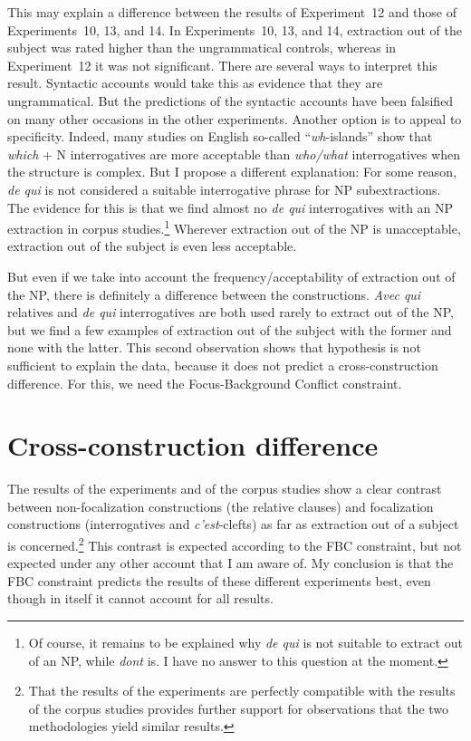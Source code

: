 This may explain a difference between the results of Experiment~12 and those of Experiments~10, 13, and 14. In Experiments~10, 13, and 14, extraction out of the subject was rated higher than the ungrammatical controls, whereas in Experiment~12 it was not significant. There are several ways to interpret this result. Syntactic accounts would take this as evidence that they are ungrammatical. But the predictions of the syntactic accounts have been falsified on many other occasions in the other experiments. Another option is to appeal to specificity. Indeed, many studies on English so-called ``\emph{wh}-islands'' show that \emph{which} + N interrogatives are more acceptable than \emph{who/what} interrogatives when the structure is complex. But I propose a different explanation: For some reason, \emph{de qui} is not considered a suitable interrogative phrase for NP subextractions. The evidence for this is that we find almost no \emph{de qui} interrogatives with an NP extraction in corpus studies.\footnote{Of course, it remains to be explained why \emph{de qui} is not suitable to extract out of an NP, while \emph{dont} is. I have no answer to this question at the moment.} Wherever extraction out of the NP is unacceptable, extraction out of the subject is even less acceptable.

But even if we take into account the frequency/acceptability of extraction out of the NP, there is definitely a difference between the constructions. \emph{Avec qui} relatives and \emph{de qui} interrogatives are both used rarely to extract out of the NP, but we find a few examples of extraction out of the subject with the former and none with the latter. This second observation shows that  hypothesis is not sufficient to explain the data, because it does not predict a cross-construction difference. For this, we need the Focus-Background Conflict constraint.

\section{Cross-construction difference}
\label{ch:exp-conclu-cross-construction}

The results of the experiments and of the corpus studies show a clear contrast between non-focalization constructions (the relative clauses) and focalization constructions (interrogatives and \emph{c'est}-clefts) as far as extraction out of a subject is concerned.\footnote{That the results of the experiments are perfectly compatible with the results of the corpus studies  provides further support for  observations that the two methodologies yield similar results.} This contrast is expected according to the FBC constraint, but not expected under any other account that I am aware of. My conclusion is that the FBC constraint predicts the results of these different experiments best, even though in itself it cannot account for all results.



